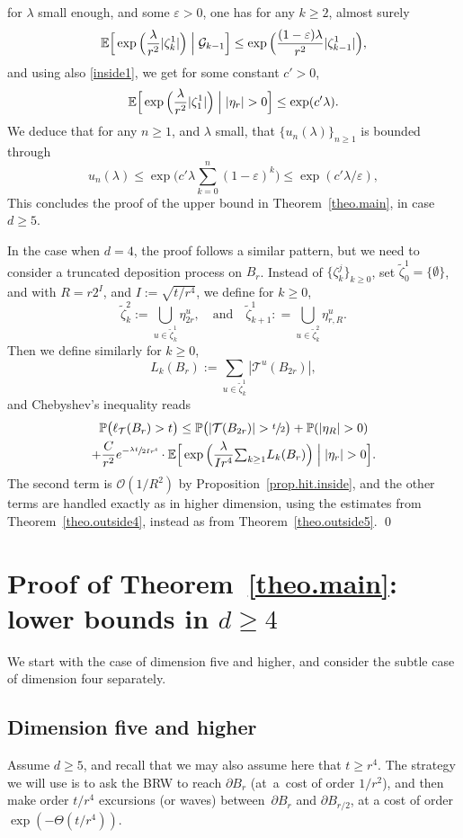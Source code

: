 \documentclass[11pt]{article}
\numberwithin{equation}{section}
\let\ts\textstyle
\theoremstyle{plain}
\theoremstyle{definition}
\newcommand{\1}{{\text{\Large $\mathfrak 1$}}}
\begin{document}
for $\lambda$ small enough, and some $\varepsilon>0$, one has for any $k\ge 2$, almost surely
\[
\mathbb E\Big[\exp\Big(\frac{\lambda}{r^2}|\zeta_k^1| \Big)\Bigm|\mathcal G_{k-1} \Big] \le \exp\Big(\frac{(1-\varepsilon)\lambda}{r^2} |\zeta_{k-1}^1|\Big),
\]
and using also \eqref{inside1}, we get for some constant $c'>0$,
\[
\mathbb E\Big[\exp\Big(\frac{\lambda}{r^2}|\zeta_1^1| \Big)\Bigm| |\eta_r|> 0 \Big] \le \exp(c'\lambda).
\]
We deduce that for any $n\ge 1$, and $\lambda$ small,
that $\{u_n(\lambda)\}_{n\ge 1}$ is bounded through
\[
u_n(\lambda) \le \exp\big(c'\lambda\ts
\sum_{k=0}^n (1-\varepsilon)^k)\le \exp(c'\lambda/\varepsilon),
\]
This concludes the proof of the upper bound in Theorem~\ref{theo.main},
in case $d\ge 5$.

In the case when $d=4$, the proof follows a similar pattern, but we
need to consider a truncated deposition process on $B_r$.
Instead of $\{\zeta_k^j\}_{k\ge 0}$,
set $\tilde \zeta_0^1 = \{\emptyset\}$, and
with $R = r2^I$, and $I:=\sqrt{t/r^4}$, we define for $k\ge 0$,
\[
\tilde \zeta_k^2:= \bigcup_{u\in \tilde \zeta_k^1} \eta^u_{2r},
\quad \text{and}\quad
\tilde \zeta_{k+1}^1: = \bigcup_{u\in \tilde \zeta_k^2}
\eta^u_{r,R}.
\]
Then we define similarly for $k\ge 0$,
\[
L_k(B_r) := \sum_{u\in \tilde \zeta_k^1} |\mathcal T^u(B_{2r})|,
\]
and Chebyshev's inequality reads
\begin{multline*}%
\mathbb P\big(\ell_{\mathcal T}(B_r)>t\big) \le
\mathbb P\big(|\mathcal T(B_{2r})|>\sfrac t2\big) +
\mathbb P(|\eta_R|>0) \\
+ \frac{C}{r^2}e^{-\sfrac{\lambda t}{2Ir^4}} \cdot
\mathbb E\Big[\exp\Big(\frac{\lambda}{Ir^4}{\ts\sum_{k\ge 1}} L_k(B_r)\Big)\Bigm| |\eta_r|> 0 \Big].
\end{multline*}
The second term is $\mathcal O(1/R^2)$ by Proposition~\ref{prop.hit.inside}, and the other terms are handled exactly as in higher dimension, using the estimates from Theorem~\ref{theo.outside4}, instead as from Theorem~\ref{theo.outside5}. \qed

\section{Proof of Theorem~\ref{theo.main}: lower bounds in \texorpdfstring{$d\ge 4$}{d4}}
\label{sec-LB4}

We start with the case of dimension five and higher,
and consider the subtle case of dimension four separately.

\subsection{Dimension five and higher}
Assume $d\ge 5$, and recall that we may also assume here that $t\ge r^4$.
The strategy we will use is to ask the BRW to reach $\partial B_r$ (at~a~cost of order $1/r^2$),
and then make order $t/r^4$ excursions (or waves) between~$\partial B_r$ and $\partial B_{r/2}$, at a cost of order $\exp(-\Theta(t/r^4))$.
\end{document}
